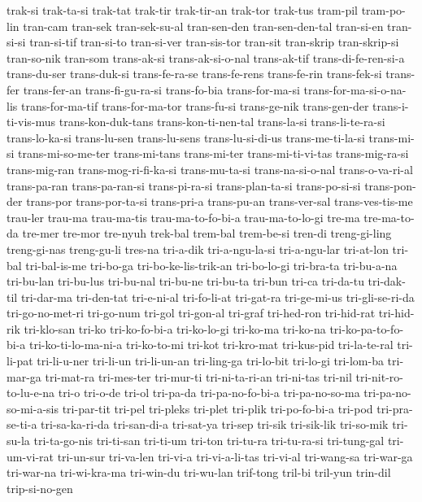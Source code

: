 {trak-si trak-ta-si trak-tat trak-tir trak-tir-an trak-tor trak-tus
tram-pil tram-po-lin tran-cam tran-sek tran-sek-su-al tran-sen-den
tran-sen-den-tal tran-si-en tran-si-si tran-si-tif tran-si-to tran-si-ver
tran-sis-tor tran-sit tran-skrip tran-skrip-si tran-so-nik tran-som
trans-ak-si trans-ak-si-o-nal trans-ak-tif trans-di-fe-ren-si-a
trans-du-ser trans-duk-si trans-fe-ra-se trans-fe-rens trans-fe-rin
trans-fek-si trans-fer trans-fer-an trans-fi-gu-ra-si trans-fo-bia
trans-for-ma-si trans-for-ma-si-o-na-lis trans-for-ma-tif trans-for-ma-tor
trans-fu-si trans-ge-nik trans-gen-der trans-i-ti-vis-mus
trans-kon-duk-tans trans-kon-ti-nen-tal trans-la-si trans-li-te-ra-si
trans-lo-ka-si trans-lu-sen trans-lu-sens trans-lu-si-di-us
trans-me-ti-la-si trans-mi-si trans-mi-so-me-ter trans-mi-tans
trans-mi-ter trans-mi-ti-vi-tas trans-mig-ra-si trans-mig-ran
trans-mog-ri-fi-ka-si trans-mu-ta-si trans-na-si-o-nal trans-o-va-ri-al
trans-pa-ran trans-pa-ran-si trans-pi-ra-si trans-plan-ta-si
trans-po-si-si trans-pon-der trans-por trans-por-ta-si trans-pri-a
trans-pu-an trans-ver-sal trans-ves-tis-me trau-ler trau-ma trau-ma-tis
trau-ma-to-fo-bi-a trau-ma-to-lo-gi tre-ma tre-ma-to-da tre-mer tre-mor
tre-nyuh trek-bal trem-bal trem-be-si tren-di treng-gi-ling treng-gi-nas
treng-gu-li tres-na tri-a-dik tri-a-ngu-la-si tri-a-ngu-lar tri-at-lon
tri-bal tri-bal-is-me tri-bo-ga tri-bo-ke-lis-trik-an tri-bo-lo-gi
tri-bra-ta tri-bu-a-na tri-bu-lan tri-bu-lus tri-bu-nal tri-bu-ne
tri-bu-ta tri-bun tri-ca tri-da-tu tri-dak-til tri-dar-ma tri-den-tat
tri-e-ni-al tri-fo-li-at tri-gat-ra tri-ge-mi-us tri-gli-se-ri-da
tri-go-no-met-ri tri-go-num tri-gol tri-gon-al tri-graf tri-hed-ron
tri-hid-rat tri-hid-rik tri-klo-san tri-ko tri-ko-fo-bi-a tri-ko-lo-gi
tri-ko-ma tri-ko-na tri-ko-pa-to-fo-bi-a tri-ko-ti-lo-ma-ni-a tri-ko-to-mi
tri-kot tri-kro-mat tri-kus-pid tri-la-te-ral tri-li-pat tri-li-u-ner
tri-li-un tri-li-un-an tri-ling-ga tri-lo-bit tri-lo-gi tri-lom-ba
tri-mar-ga tri-mat-ra tri-mes-ter tri-mur-ti tri-ni-ta-ri-an tri-ni-tas
tri-nil tri-nit-ro-to-lu-e-na tri-o tri-o-de tri-ol tri-pa-da
tri-pa-no-fo-bi-a tri-pa-no-so-ma tri-pa-no-so-mi-a-sis tri-par-tit
tri-pel tri-pleks tri-plet tri-plik tri-po-fo-bi-a tri-pod tri-pra-se-ti-a
tri-sa-ka-ri-da tri-san-di-a tri-sat-ya tri-sep tri-sik tri-sik-lik
tri-so-mik tri-su-la tri-ta-go-nis tri-ti-san tri-ti-um tri-ton tri-tu-ra
tri-tu-ra-si tri-tung-gal tri-um-vi-rat tri-un-sur tri-va-len tri-vi-a
tri-vi-a-li-tas tri-vi-al tri-wang-sa tri-war-ga tri-war-na tri-wi-kra-ma
tri-win-du tri-wu-lan trif-tong tril-bi tril-yun trin-dil trip-si-no-gen
}
